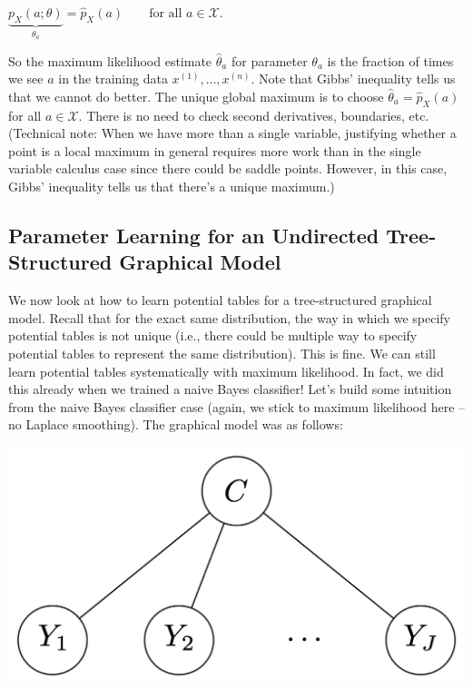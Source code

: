 {\centering$\underbrace{p_{X}(a;\theta )}_{\theta _{a}}=\widehat{p}_{X}(a)\qquad \text {for all }a\in \mathcal{X}.$ \par}
 
So the maximum likelihood estimate $\widehat{\theta }_{a}$ for parameter $\theta _{a}$ is the fraction of times we see $a$ in the training data $x^{(1)},\dots ,x^{(n)}$. Note that Gibbs' inequality tells us that we cannot do better. The unique global maximum is to choose $\widehat{\theta }_{a}=\widehat{p}_{X}(a)$ for all $a\in \mathcal{X}$. There is no need to check second derivatives, boundaries, etc. (Technical note: When we have more than a single variable, justifying whether a point is a local maximum in general requires more work than in the single variable calculus case since there could be saddle points. However, in this case, Gibbs' inequality tells us that there's a unique maximum.)


\subsection{Parameter Learning for an Undirected Tree-Structured Graphical Model}

We now look at how to learn potential tables for a tree-structured graphical model. Recall that for the exact same distribution, the way in which we specify potential tables is not unique (i.e., there could be multiple way to specify potential tables to represent the same distribution). This is fine. We can still learn potential tables systematically with maximum likelihood. In fact, we did this already when we trained a naive Bayes classifier! Let's build some intuition from the naive Bayes classifier case (again, we stick to maximum likelihood here -- no Laplace smoothing). The graphical model was as follows:

{\centering\includegraphics[scale=0.3]{images_naive-bayes} \par}


